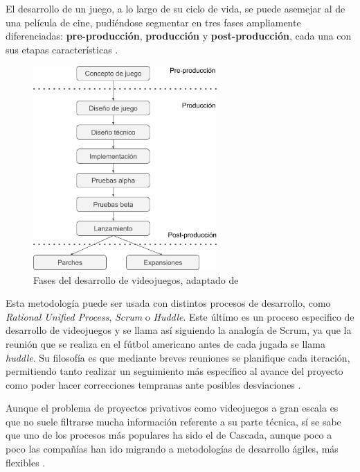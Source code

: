 El desarrollo de un juego, a lo largo de su ciclo de vida, se puede asemejar al de una película de cine, pudiéndose segmentar en tres fases ampliamente diferenciadas: \textbf{pre-producción}, \textbf{producción} y \textbf{post-producción}, cada una con sus etapas características \cite{bet-03}.

\vspace{0.4cm}

\begin{figure}[!h]
    \begin{center}
        \includegraphics[width=0.625\textwidth]{imagenes/5/pre-prod-post.png}
        \caption{Fases del desarrollo de videojuegos, adaptado de \cite{man-14}}
        \label{fig:fases-desarrollo}
    \end{center}
\end{figure}

Esta metodología puede ser usada con distintos procesos de desarrollo, como \textit{Rational Unified Process}, \textit{Scrum} o \textit{Huddle}. Este último es un proceso especifico de desarrollo de videojuegos y se llama así siguiendo la analogía de Scrum, ya que la reunión que se realiza en el fútbol americano antes de cada jugada se llama \textit{huddle}. Su filosofía es que mediante breves reuniones se planifique cada iteración, permitiendo tanto realizar un seguimiento más específico al avance del proyecto como poder hacer correcciones tempranas ante posibles desviaciones \cite{mor-10}.

Aunque el problema de proyectos privativos como videojuegos a gran escala es que no suele filtrarse mucha información referente a su parte técnica, sí se sabe que uno de los procesos más populares ha sido el de Cascada, aunque poco a poco las compañías han ido migrando a metodologías de desarrollo ágiles, más flexibles \cite{mor-10}.

